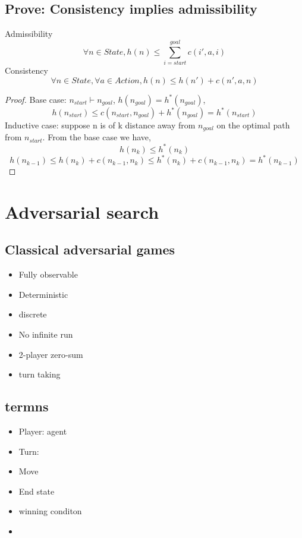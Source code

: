 \documentclass{article}
\begin{document}
\subsection*{Prove: Consistency implies admissibility}
Admissibility
\begin{equation}
    \forall n \in State, h(n) \leq \sum_{i = start}^{goal}c(i', a, i)
\end{equation}
Consistency
\begin{equation}
    \forall n \in State, \forall a \in Action, h(n) \leq h(n') + c(n', a, n)
\end{equation}
\begin{proof}
    Base case: $n_{start} \vdash n_{goal}$, $h(n_{goal}) = h^*(n_{goal})$, 
    \[h(n_{start}) \leq c(n_{start}, n_{goal}) + h^*(n_{goal}) = h^*(n_{start})\]
    Inductive case: suppose n is of k distance away from $n_{goal}$ on the optimal path from $n_{start}$. From the base case we have, 
    \[h(n_k) \leq h^*(n_k)\]
    \[h(n_{k-1}) \leq h(n_k) + c(n_{k-1}, n_k) \leq h^*(n_k) + c(n_{k-1}, n_k) = h^*(n_{k-1})\]


\end{proof}



\section{Adversarial search}
\subsection{Classical adversarial games}
\begin{itemize}
    \item Fully observable
    \item Deterministic
    \item discrete
    \item No infinite run
    \item 2-player zero-sum
    \item turn taking
\end{itemize}
\subsection*{termns}
\begin{itemize}
    \item Player: agent
    \item Turn: 
    \item Move
    \item End state
    \item winning conditon
    \item 
\end{itemize}
\end{document}
